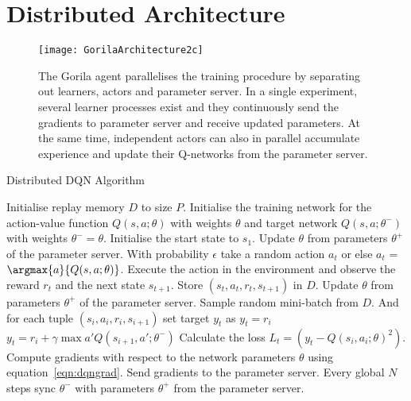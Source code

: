 \section{Distributed Architecture}

\begin{figure*}[ht]
	\begin{center}
		\centerline{\texttt{[image: GorilaArchitecture2c]}}
		\caption{The Gorila agent parallelises the training procedure by separating out learners, actors and parameter server. In a single experiment, several learner processes exist and they continuously send the gradients to parameter server and receive updated parameters. At the same time, independent actors can also in parallel accumulate experience and update their Q-networks from the parameter server. }
		\label{Gorila-figure}
	\end{center}
	\vskip -0.2in
\end{figure*}

\begin{algorithm}[t]
	\caption{Distributed DQN Algorithm}
	\label{alg:DistDQNAlgo}
	\begin{algorithmic}
		\STATE Initialise replay memory $D$ to size $P$.
		\STATE Initialise the training network for the action-value function $Q(s,a;\theta)$ with weights $\theta$ and target network $Q(s,a;\theta^-)$ with weights $\theta^- = \theta$.
		\STATE Initialise the start state to $s_{1}$.
		\STATE Update $\theta$ from parameters $\theta^+$ of the parameter server.
		\STATE With probability $\epsilon$ take a random action $a_{t}$ or else $a_{t}$ = $\argmax{a}{Q(s, a ;\theta)}$.
		\STATE Execute the action in the environment and observe the reward $r_t$ and the next state $s_{t+1}$. Store $(s_t,a_t,r_t,s_{t+1})$ in $D$.
		\STATE Update $\theta$ from parameters $\theta^+$ of the parameter server.
		\STATE Sample random mini-batch from $D$. And for each tuple $(s_i,a_i,r_i,s_{i+1})$ set target $y_t$ as
		\STATE $y_t = r_i$
		\ELSE
		\STATE $y_t = r_i + \gamma \max{a'}{Q(s_{i+1}, a' ; \theta^{-})}$
		\ENDIF
		\STATE Calculate the loss $L_t = (y_t - Q(s_i, a_i ; \theta)^2)$.
		\STATE Compute gradients with respect to the network parameters $\theta$ using equation~\ref{eqn:dqngrad}.
		\STATE Send gradients to the parameter server.
		\STATE Every global $N$ steps sync $\theta^{-}$ with parameters $\theta^+$ from the parameter server.
		\ENDFOR
		\ENDFOR
	\end{algorithmic}
\end{algorithm}

